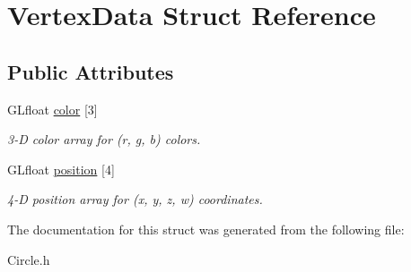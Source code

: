 \hypertarget{struct_vertex_data}{}\section{Vertex\+Data Struct Reference}
\label{struct_vertex_data}
\subsection*{Public Attributes}
\begin{DoxyCompactItemize}
\item 
\mbox{\label{struct_vertex_data_a305475959e3c612d733b423f55f16709}} 
G\+Lfloat \hyperlink{struct_vertex_data_a305475959e3c612d733b423f55f16709}{color} \mbox{[}3\mbox{]}
\begin{DoxyCompactList}\small\item\em 3-\/D color array for (r, g, b) colors. \end{DoxyCompactList}\item 
\mbox{\label{struct_vertex_data_ad1ef7bb4d1a61dd585fe64f3167c31d6}} 
G\+Lfloat \hyperlink{struct_vertex_data_ad1ef7bb4d1a61dd585fe64f3167c31d6}{position} \mbox{[}4\mbox{]}
\begin{DoxyCompactList}\small\item\em 4-\/D position array for (x, y, z, w) coordinates. \end{DoxyCompactList}\end{DoxyCompactItemize}


The documentation for this struct was generated from the following file\+:\begin{DoxyCompactItemize}
\item 
Circle.\+h\end{DoxyCompactItemize}
